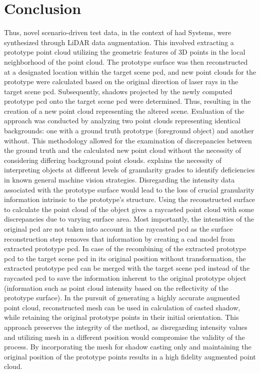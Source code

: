 \section{Conclusion}
Thus, novel scenario-driven test data, in the context of \acrfull{had} Systems, were synthesized through LiDAR data augmentation. This involved extracting a prototype point cloud utilizing the geometric features of 3D points in the local neighborhood of the point cloud. The prototype surface was then reconstructed at a designated location within the target scene \acrshort{pcd}, and new point clouds for the prototype were calculated based on the original direction of laser rays in the target scene \acrshort{pcd}. Subsequently, shadows projected by the newly computed prototype \acrshort{pcd} onto the target scene \acrshort{pcd} were determined. Thus, resulting in the creation of a new point cloud representing the altered scene. Evaluation of the approach was conducted by analyzing two point clouds representing identical backgrounds: one with a ground truth prototype (foreground object) and another without. This methodology allowed for the examination of discrepancies between the ground truth and the calculated new point cloud without the necessity of considering differing background point clouds. 
\parencite{padusinski2024machine} explains the necessity of interpreting objects at different levels of granularity grades to identify deficiencies in known general machine vision strategies. Disregarding the intensity data associated with the prototype surface would lead to the loss of crucial granularity information intrinsic to the prototype's structure.
Using the reconstructed surface to calculate the point cloud of the object gives a raycasted point cloud with some discrepancies due to varying surface area. Most importantly, the intensities of the original \acrshort{pcd} are not taken into account in the raycasted \acrshort{pcd} as the surface reconstruction step removes that information by creating a \acrshort{cad} model from extracted prototype \acrshort{pcd}. In case of the recombining of the extracted prototype \acrshort{pcd} to the target scene \acrshort{pcd} in its original position without transformation, the extracted prototype \acrshort{pcd} can be merged with the target scene \acrshort{pcd} instead of the raycasted \acrshort{pcd} to save the information inherent to the original prototype object (information such as point cloud intensity based on the reflectivity of the prototype surface). In the pursuit of generating a highly accurate augmented point cloud, reconstructed mesh can be used in calculation of casted shadow, while retaining the original prototype points in their initial orientation. This approach preserves the integrity of the method, as disregarding intensity values and utilizing mesh in a different position would compromise the validity of the process. By incorporating the mesh for shadow casting only and maintaining the original position of the prototype points results in a high fidelity augmented point cloud.

